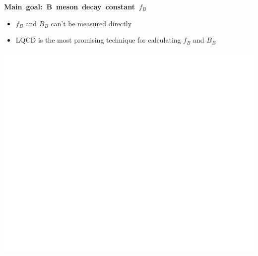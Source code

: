 \documentclass[landscape]{article}
\newenvironment{slide}[1][ ]{\mbox{\bf #1 } \vfill}{\vfill \mbox{ } \pagebreak}
\begin{document}
\begin{slide}[Main goal: B meson decay constant \boldmath $f_B$]
\begin{minipage}{14 cm}
\begin{itemize}
\item $f_B$ and $B_B$ can't be measured directly

\vspace{1 cm}

\item LQCD is the most promising technique for calculating $f_B$ and $B_B$
\end{itemize}
\end{minipage} \hfill \begin{minipage}{10 cm} \includegraphics[width=\linewidth]{ckm04-white} \end{minipage}

\end{slide}
\end{document}
